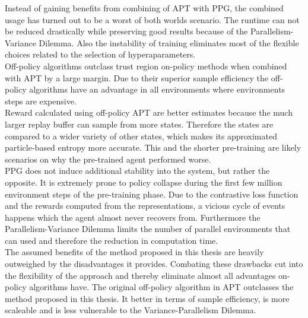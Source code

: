 \documentclass{article}
\begin{document}
Instead of gaining benefits from combining of APT with PPG, the combined usage has turned out to be a worst of both worlds scenario.
The runtime can not be reduced drastically while preserving good results because of the Parallelism-Variance Dilemma. 
Also the instability of training eliminates most of the flexible choices related to the selection of hyperaparameters.\\
Off-policy algorithms outclass trust region on-policy methods when combined with APT by a large margin.
Due to their superior sample efficiency the off-policy algorithms have an advantage in all environments where
environments steps are expensive.\\
Reward calculated using off-policy APT are better estimates because the much
larger replay buffer can sample from more states. Therefore the states are compared
to a wider variety of other states, which makes its approximated particle-based entropy more accurate.
This and the shorter pre-training are likely scenarios on why the pre-trained agent performed worse.\\
PPG does not induce additional stability into the system, but rather the opposite. It is extremely prone to
policy collapse during the first few million environment steps of the pre-training phase. Due to
the contrastive loss function and the rewards computed from the representations, a vicious cycle of events
happens which the agent almost never recovers from.
Furthermore the Parallelism-Variance Dilemma limits the number of parallel environments that can used and therefore
the reduction in computation time.\\
The assumed benefits of the method proposed in this thesis are heavily outweighed by the disadvantages it provides.
Combating these drawbacks cut into the flexibility of the approach and thereby eliminate almost all advantages
on-policy algorithms have.
The original off-policy algorithm in APT outclasses the method proposed in this thesis. It better
in terms of sample efficiency, is more scaleable and is less vulnerable to the Variance-Parallelism Dilemma.

\newpage
{}

\newpage
\end{document}
